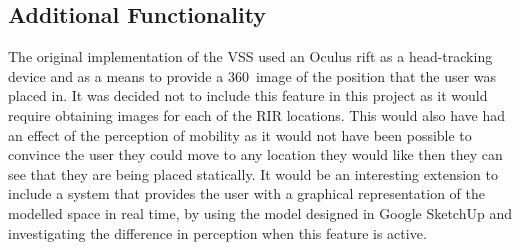 \documentclass[../../main.tex]{subfiles}
\begin{document}
	\subsection{Additional Functionality}
		The original implementation of the \ac{VSS} used an Oculus rift as a head-tracking device and as a means to provide a 360\textdegree~image of the position that the user was placed in. It was decided not to include this feature in this project as it would require obtaining images for each of the \ac{RIR} locations. This would also have had an effect of the perception of mobility as it would not have been possible to convince the user they could move to any location they would like then they can see that they are being placed statically. It would be an interesting extension to include a system that provides the user with a graphical representation of the modelled space in real time, by using the model designed in Google SketchUp and investigating the difference in perception when this feature is active.








\label{realRIRs}
\end{document}
